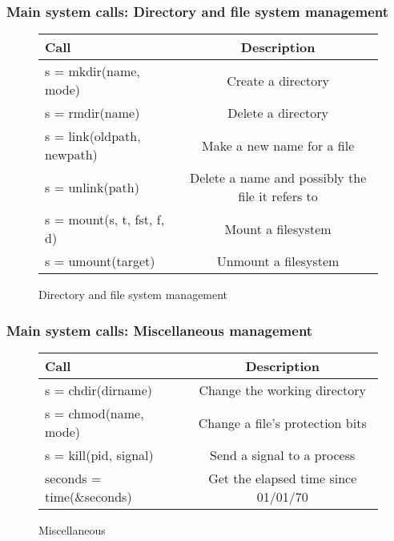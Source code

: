 \begin{frame}
  \frametitle{Main system calls: Directory and file system management}
  \begin{figure}
    \centering
    \begin{tabular}{l|c}
      Call                  & Description \\ \hline
      {\scriptsize s = mkdir(name, mode)}          & Create a directory \\ \hline
      {\scriptsize s = rmdir(name)}          & Delete a directory \\ \hline
      {\scriptsize s = link(oldpath, newpath)}          & Make a new name for a file \\ \hline
      {\scriptsize s = unlink(path)}          & Delete a name and possibly the file it refers to \\ \hline
      {\scriptsize s = mount(s, t, fst, f, d)}          & Mount a filesystem \\ \hline
      {\scriptsize s = umount(target)}          & Unmount a filesystem \\ \hline
    \end{tabular}
    \caption{Directory and file system management}
    \label{fig:sys-call_dir}
  \end{figure}
\end{frame}


\begin{frame}
  \frametitle{Main system calls: Miscellaneous management}
  \begin{figure}
    \centering
    \begin{tabular}{l|c}
      Call                  & Description \\ \hline
      {\scriptsize s = chdir(dirname)}          & Change the working directory \\ \hline
      {\scriptsize s = chmod(name, mode)}       & Change a file's protection bits \\ \hline
      {\scriptsize s = kill(pid, signal)}       & Send a signal to a process \\ \hline
      {\scriptsize seconds = time(\&seconds)}    & Get the elapsed time since 01/01/70 \\ \hline
    \end{tabular}
    \caption{Miscellaneous}
    \label{fig:sys-call_misc}
  \end{figure}
\end{frame}

